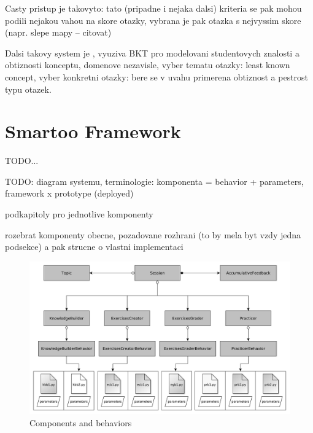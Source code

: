 \documentclass[a4paper, 12pt, twoside]{fithesis2}		%
\renewcommand{\_}{\leavevmode \kern0.0em\vbox{\hrule width0.4em}}
\begin{document}
Casty pristup je takovyto: tato (pripadne i nejaka dalsi) kriteria se pak mohou podili nejakou vahou na skore otazky, vybrana je pak otazka s nejvyssim skore (napr. slepe mapy -- citovat)

Dalsi takovy system je
\cite{question-gen-adapt-bayes}, vyuziva BKT pro modelovani studentovych znalosti a obtiznosti konceptu,  domenove nezavisle, vyber tematu otazky: least known concept, vyber konkretni otazky: bere se v uvahu primerena obtiznost a pestrost typu otazek.




\chapter{Smartoo Framework}
\label{chap:smartoo}

TODO...

TODO: diagram systemu, terminologie: komponenta = behavior + parameters, framework x prototype (deployed)

podkapitoly pro jednotlive komponenty

rozebrat komponenty obecne, pozadovane rozhrani (to by mela byt vzdy jedna podsekce) a pak strucne o vlastni implementaci

\begin{figure}[h]
  \centering
  \includegraphics[width=\textwidth]{images/architecture.pdf}
  \caption{Components and behaviors}
  \label{fig:smartoo-architecture}
\end{figure}
\end{document}

